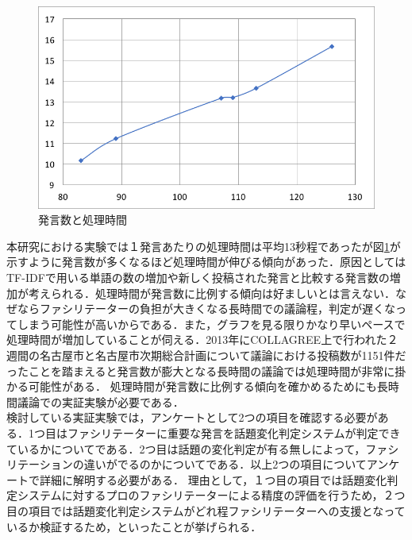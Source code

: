 \begin{figure}[htbp]
 \begin{center}
  \includegraphics[width=\textwidth]{../images/6.Conclusion/Graph-Remark&Time.png}
  \caption{発言数と処理時間}
  \label{Fig:Graph-Remark&Time}
  \vspace{-10pt}
 \end{center}
\end{figure}

本研究における実験では１発言あたりの処理時間は平均13秒程であったが図\ref{Fig:Graph-Remark&Time}が示すように発言数が多くなるほど処理時間が伸びる傾向があった．原因としてはTF-IDFで用いる単語の数の増加や新しく投稿された発言と比較する発言数の増加が考えられる．処理時間が発言数に比例する傾向は好ましいとは言えない．なぜならファシリテーターの負担が大きくなる長時間での議論程，判定が遅くなってしまう可能性が高いからである．また，グラフを見る限りかなり早いペースで処理時間が増加していることが伺える．2013年にCOLLAGREE\cite{collagree_Experiment}上で行われた２週間の名古屋市と名古屋市次期総合計画について議論における投稿数が1151件だったことを踏まえると発言数が膨大となる長時間の議論では処理時間が非常に掛かる可能性がある．
処理時間が発言数に比例する傾向を確かめるためにも長時間議論での実証実験が必要である．
\\
検討している実証実験では，アンケートとして2つの項目を確認する必要がある．1つ目はファシリテーターに重要な発言を話題変化判定システムが判定できているかについてである．2つ目は話題の変化判定が有る無しによって，ファシリテーションの違いがでるのかについてである．以上2つの項目についてアンケートで詳細に解明する必要がある．
理由として，１つ目の項目では話題変化判定システムに対するプロのファシリテーターによる精度の評価を行うため，２つ目の項目では話題変化判定システムがどれ程ファシリテーターへの支援となっているか検証するため，といったことが挙げられる．

